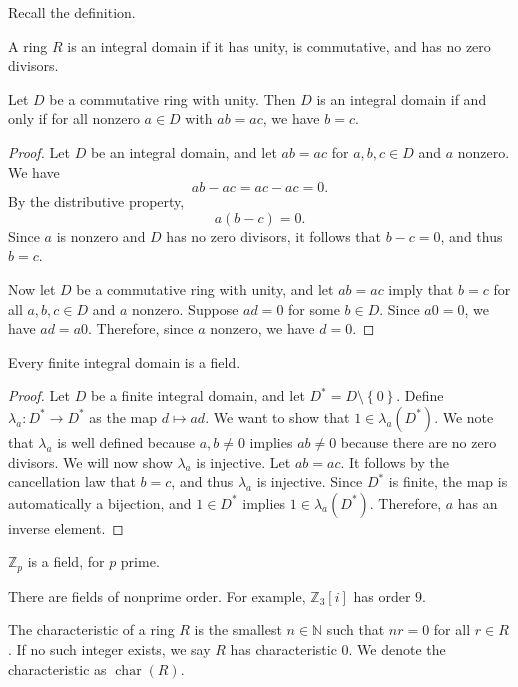 Recall the definition.
\begin{definition}\label{dfn:IID}
	A ring $R$ is an integral domain if it has unity, is commutative, and has no zero divisors.
\end{definition}
\begin{proposition}
	Let $D$ be a commutative ring with unity. Then $D$ is an integral domain if and only if for all nonzero $a\in D$ with $ab=ac$, we have $b=c$.
\end{proposition}
\begin{proof}
	Let $D$ be an integral domain, and let $ab=ac$ for $a,b,c\in D$ and $a$ nonzero. We have
	\[
		ab-ac=ac-ac=0
	.\]
	By the distributive property,
	\[
		a(b-c)=0
	.\]
	Since $a$ is nonzero and $D$ has no zero divisors, it follows that $b-c=0$, and thus $b=c$.

	Now let $D$ be a commutative ring with unity, and let $ab=ac$ imply that $b=c$ for all $a,b,c\in D$ and $a$ nonzero. Suppose $ad=0$ for some $b\in D$. Since $a0=0$, we have $ad=a0$. Therefore, since $a$ nonzero, we have $d=0$.
\end{proof}
\begin{theorem}\label{thm:17}
	Every finite integral domain is a field.
\end{theorem}
\begin{proof}
	Let $D$ be a finite integral domain, and let $D^*=D\setminus\left\{ 0 \right\} $. Define $\lambda_a : D^* \to D^*$ as the map $d\mapsto ad$. We want to show that $1\in\lambda_a(D^*)$. We note that $\lambda_a$ is well defined because $a,b\neq 0$ implies $ab\neq 0$ because there are no zero divisors. We will now show $\lambda_a$ is injective. Let $ab=ac$. It follows by the cancellation law that $b=c$, and thus $\lambda_a$ is injective. Since $D^*$ is finite, the map is automatically a bijection, and $1\in D^*$ implies $1\in \lambda_a(D^*)$. Therefore, $a$ has an inverse element.
\end{proof}
\begin{corollary}
	$\mathbb{Z}_p$ is a field, for $p$ prime.
\end{corollary}
There are fields of nonprime order. For example, $\mathbb{Z}_3[i]$ has order $9$.
\begin{definition}[Characteristic]\label{dfn:aaj}
	The characteristic of a ring $R$ is the smallest $n\in\mathbb{N}$ such that $nr=0$ for all $r\in R$. If no such integer exists, we say  $R$ has characteristic 0. We denote the characteristic as $\operatorname{char}(R) $.
\end{definition}
